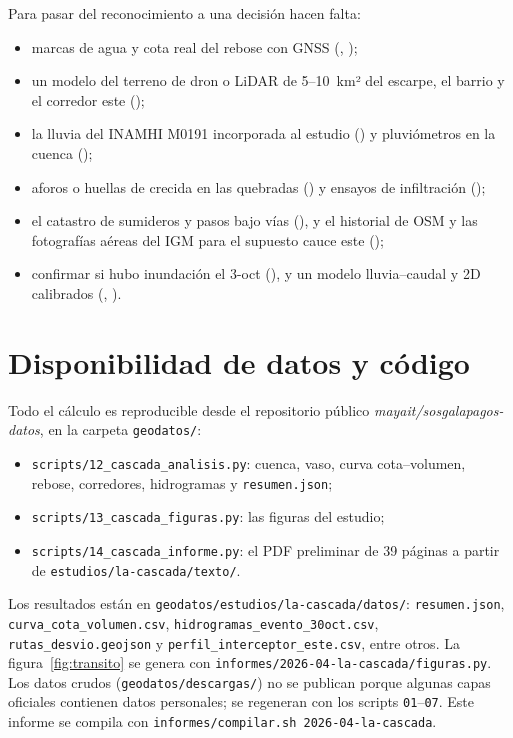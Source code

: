 \documentclass{sosg-informe}
\begin{document}
Para pasar del reconocimiento a una decisión hacen falta:
\begin{itemize}
  \item marcas de agua y cota real del rebose con GNSS (, );
  \item un modelo del terreno de dron o LiDAR de 5--10~km² del escarpe, el barrio y el corredor este ();
  \item la lluvia del INAMHI M0191 incorporada al estudio () y pluviómetros en la cuenca ();
  \item aforos o huellas de crecida en las quebradas () y ensayos de infiltración ();
  \item el catastro de sumideros y pasos bajo vías (), y el historial de OSM y las fotografías aéreas del IGM para el supuesto cauce este ();
  \item confirmar si hubo inundación el 3-oct (), y un modelo lluvia--caudal y 2D calibrados (, ).
\end{itemize}

\section*{Disponibilidad de datos y código}
{\small\sloppy Todo el cálculo es reproducible desde el repositorio público \emph{mayait/sosgalapagos-datos}, en la carpeta \texttt{geodatos/}:
\begin{itemize}
  \item \texttt{scripts/12\_cascada\_analisis.py}: cuenca, vaso, curva cota--volumen, rebose, corredores, hidrogramas y \texttt{resumen.json};
  \item \texttt{scripts/13\_cascada\_figuras.py}: las figuras del estudio;
  \item \texttt{scripts/14\_cascada\_informe.py}: el PDF preliminar de 39 páginas a partir de \texttt{estudios/la-cascada/texto/}.
\end{itemize}
Los resultados están en \texttt{geodatos/estudios/la-cascada/datos/}: \texttt{resumen.json}, \texttt{curva\_cota\_volumen.csv}, \texttt{hidrogramas\_evento\_30oct.csv}, \texttt{rutas\_desvio.geojson} y \texttt{perfil\_interceptor\_este.csv}, entre otros. La figura~\ref{fig:transito} se genera con \texttt{informes/2026-04-la-cascada/figuras.py}. Los datos crudos (\texttt{geodatos/descargas/}) no se publican porque algunas capas oficiales contienen datos personales; se regeneran con los scripts \texttt{01}--\texttt{07}. Este informe se compila con \texttt{informes/compilar.sh 2026-04-la-cascada}.\par}



\end{document}
